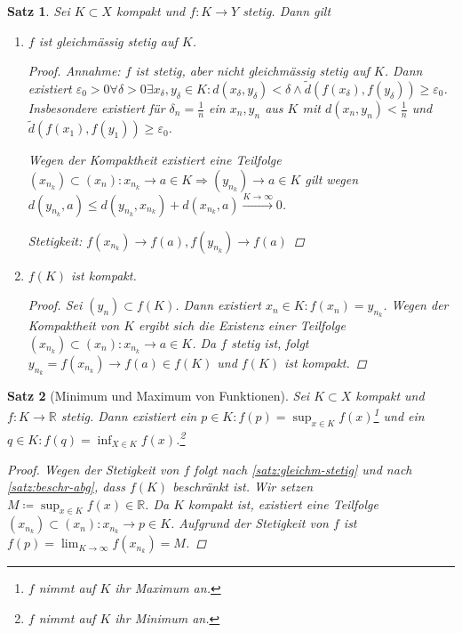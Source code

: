\documentclass[ngerman,titlepage,twoside, parskip=half*]{scrreprt}
\newcommand*{\R}{\mathbb{R}}
\theoremstyle{break}
\newtheorem{theorem}{Satz}[section]
\theoremstyle{nonumberbreak}
\newtheorem{proof}{Beweis:}
\begin{document}
\begin{theorem}\label{satz:gleichm-stetig}
  Sei $K\subset X$ kompakt und $f\colon K\rightarrow Y$ stetig. Dann gilt
  \begin{enumerate}[(1)]
  \item $f$ ist gleichmässig stetig auf $K$.
    \begin{proof}
      Annahme: $f$ ist stetig, aber nicht gleichmässig stetig auf
      $K$. Dann existiert $\varepsilon_0>0 \forall \delta >0 \exists
      x_{\delta},y_{\delta}\in K\colon d(x_{\delta},
      y_{\delta})<\delta\wedge\tilde{d}(f(x_{\delta}),f(y_{\delta}))\geq
      \varepsilon_0$. Insbesondere existiert für
      $\delta_n=\frac{1}{n}$ ein $x_n,y_n$ aus $K$ mit
      $d(x_n,y_n)<\frac{1}{n}$ und $\tilde{d}(f(x_1),f(y_1))\geq
      \varepsilon_0$.

      Wegen der Kompaktheit existiert eine Teilfolge $(x_{n_k})\subset
      (x_n)\colon x_{n_k}\rightarrow a\in K \Rightarrow
      (y_{n_k})\rightarrow a\in K$ gilt wegen $d(y_{n_k},a)\leq
      d(y_{n_k},x_{n_k})+d(x_{n_k},a)\xrightarrow{K\rightarrow\infty}0$.

      Stetigkeit: $f(x_{n_k})\rightarrow f(a), f(y_{n_k})\rightarrow
      f(a)$\lightning
    \end{proof}
  \item $f(K)$  ist kompakt.
    \begin{proof}
      Sei $(y_n)\subset f(K)$. Dann existiert $x_n \in K\colon
      f(x_n)=y_{n_k}$. Wegen der Kompaktheit von $K$ ergibt sich die
      Existenz einer Teilfolge $(x_{n_k})\subset (x_n)\colon x_{n_k}\rightarrow
    a \in K$. Da $f$ stetig ist, folgt $y_{n_k}=f(x_{n_k})\rightarrow
    f(a) \in f(K)$ und $f(K)$ ist kompakt.
    \end{proof}    
\end{enumerate}
\end{theorem}

\begin{theorem}[Minimum und Maximum von Funktionen]\label{satz:max-fkt}
  Sei $K\subset X$ kompakt und $f\colon K\rightarrow\R$ stetig. Dann
  existiert ein $p \in K\colon f(p)=\sup_{x\in K}f(x)$\footnote{$f$
    nimmt auf $K$ ihr Maximum an.} und ein $q \in K\colon
  f(q)=\inf_{X\in K}f(x)$.\footnote{$f$ nimmt auf $K$ ihr Minimum an.}
  \begin{proof}
    Wegen der Stetigkeit von $f$ folgt nach
    \autoref{satz:gleichm-stetig} und nach \autoref{satz:beschr-abg}, dass
    $f(K)$ beschränkt ist. Wir setzen $M\coloneqq\sup_{x\in K}
    f(x)\in\R$. Da $K$ kompakt ist, existiert eine Teilfolge
    $(x_{n_k})\subset (x_n)\colon x_{n_k}\rightarrow p\in K$. Aufgrund
    der Stetigkeit von $f$ ist  $f(p)=\lim_{K\rightarrow \infty}
    f(x_{n_{k}})=M$.
  \end{proof}
\end{theorem}
\end{document}
